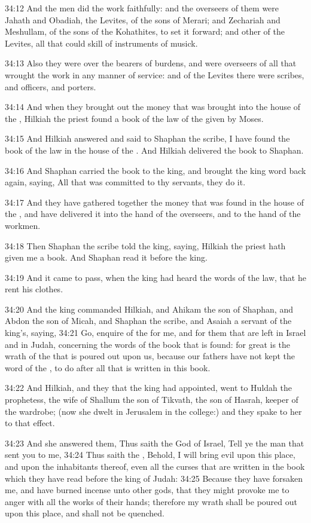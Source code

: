34:12 And the men did the work faithfully: and the overseers of them
were Jahath and Obadiah, the Levites, of the sons of Merari; and
Zechariah and Meshullam, of the sons of the Kohathites, to set it
forward; and other of the Levites, all that could skill of instruments
of musick.

34:13 Also they were over the bearers of burdens, and were overseers
of all that wrought the work in any manner of service: and of the
Levites there were scribes, and officers, and porters.

34:14 And when they brought out the money that was brought into the
house of the \LORD, Hilkiah the priest found a book of the law of the
\LORD given by Moses.

34:15 And Hilkiah answered and said to Shaphan the scribe, I have
found the book of the law in the house of the \LORD. And Hilkiah
delivered the book to Shaphan.

34:16 And Shaphan carried the book to the king, and brought the king
word back again, saying, All that was committed to thy servants, they
do it.

34:17 And they have gathered together the money that was found in the
house of the \LORD, and have delivered it into the hand of the
overseers, and to the hand of the workmen.

34:18 Then Shaphan the scribe told the king, saying, Hilkiah the
priest hath given me a book. And Shaphan read it before the king.

34:19 And it came to pass, when the king had heard the words of the
law, that he rent his clothes.

34:20 And the king commanded Hilkiah, and Ahikam the son of Shaphan,
and Abdon the son of Micah, and Shaphan the scribe, and Asaiah a
servant of the king's, saying, 34:21 Go, enquire of the \LORD for me,
and for them that are left in Israel and in Judah, concerning the
words of the book that is found: for great is the wrath of the \LORD
that is poured out upon us, because our fathers have not kept the word
of the \LORD, to do after all that is written in this book.

34:22 And Hilkiah, and they that the king had appointed, went to
Huldah the prophetess, the wife of Shallum the son of Tikvath, the son
of Hasrah, keeper of the wardrobe; (now she dwelt in Jerusalem in the
college:) and they spake to her to that effect.

34:23 And she answered them, Thus saith the \LORD God of Israel, Tell
ye the man that sent you to me, 34:24 Thus saith the \LORD, Behold, I
will bring evil upon this place, and upon the inhabitants thereof,
even all the curses that are written in the book which they have read
before the king of Judah: 34:25 Because they have forsaken me, and
have burned incense unto other gods, that they might provoke me to
anger with all the works of their hands; therefore my wrath shall be
poured out upon this place, and shall not be quenched.

